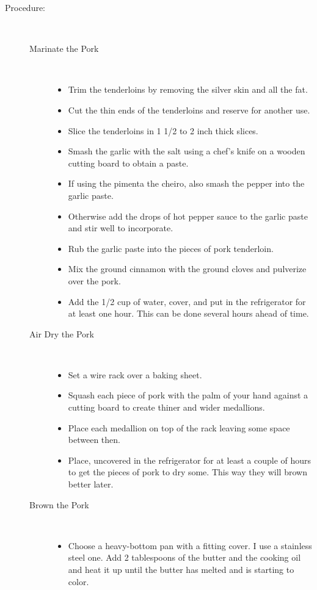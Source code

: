 \documentclass[11pt,letterpaper]{article}
\begin{document}
\begin{description}
\item[Procedure:]\ \\
        \begin{description}
        \item[Marinate the Pork]\ \\
                \begin{itemize}
			\item Trim the tenderloins by removing the silver skin and all the fat.
			\item Cut the thin ends of the tenderloins and reserve for another use.
			\item Slice the tenderloins in 1 1/2 to 2 inch thick slices.
			\item Smash the garlic with the salt using a chef's knife on a wooden cutting board to obtain a paste.
			\item If using the pimenta the cheiro, also smash the pepper into the garlic paste.
			\item Otherwise add the drops of hot pepper sauce to the garlic paste and stir well to incorporate.
			\item Rub the garlic paste into the pieces of pork tenderloin.
			\item Mix the ground cinnamon with the ground cloves and pulverize over the pork.
			\item Add the 1/2 cup of water, cover, and put in the refrigerator for at least one hour. This can be done several hours ahead of time.
		\end{itemize}
	\item[Air Dry the Pork]\ \\
		\begin{itemize}
			\item Set a wire rack over a baking sheet.
			\item Squash each piece of pork with the palm of your hand against a cutting board to create thiner and wider medallions.
			\item Place each medallion on top of the rack leaving some space between then. 
			\item Place, uncovered in the refrigerator for at least a couple of hours to get the pieces of pork to dry some. This way they will brown better later.
		\end{itemize}
	\item[Brown the Pork]\ \\
		\begin{itemize}
			\item Choose a heavy-bottom pan with a fitting cover. I use a stainless steel one. Add 2 tablespoons of the butter and the cooking oil and heat it up until the butter has melted and is starting to color.

\end{itemize}
\end{description}
\end{description}
\end{document}
